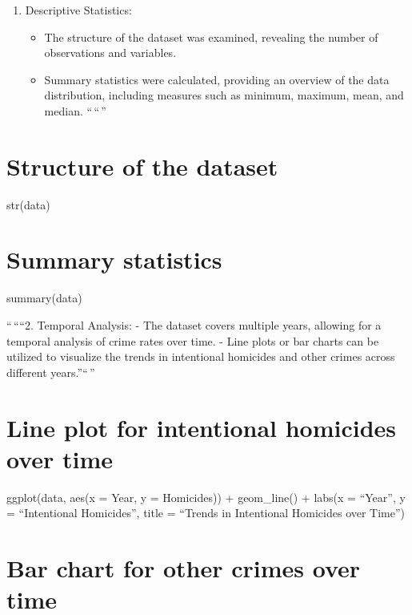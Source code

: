 \documentclass[
]{article}
\providecommand{\tightlist}{%
  \setlength{\itemsep}{0pt}\setlength{\parskip}{0pt}}
\begin{document}
\begin{enumerate}
\def\labelenumi{\arabic{enumi}.}
\tightlist
\item
  Descriptive Statistics:

  \begin{itemize}
  \tightlist
  \item
    The structure of the dataset was examined, revealing the number of
    observations and variables.
  \item
    Summary statistics were calculated, providing an overview of the
    data distribution, including measures such as minimum, maximum,
    mean, and median. ``\,``\,''
  \end{itemize}
\end{enumerate}

\hypertarget{structure-of-the-dataset}{%
\section{Structure of the dataset}\label{structure-of-the-dataset}}

str(data)

\hypertarget{summary-statistics}{%
\section{Summary statistics}\label{summary-statistics}}

summary(data)

``\,````2. Temporal Analysis: - The dataset covers multiple years,
allowing for a temporal analysis of crime rates over time. - Line plots
or bar charts can be utilized to visualize the trends in intentional
homicides and other crimes across different years.''``\,''

\hypertarget{line-plot-for-intentional-homicides-over-time}{%
\section{Line plot for intentional homicides over
time}\label{line-plot-for-intentional-homicides-over-time}}

ggplot(data, aes(x = Year, y = Homicides)) + geom\_line() + labs(x =
``Year'', y = ``Intentional Homicides'', title = ``Trends in Intentional
Homicides over Time'')

\hypertarget{bar-chart-for-other-crimes-over-time}{%
\section{Bar chart for other crimes over
time}\label{bar-chart-for-other-crimes-over-time}}
\end{document}
